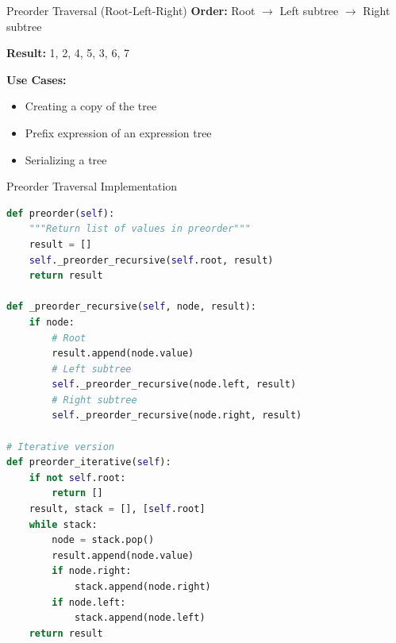 \documentclass[aspectratio=169]{beamer}
\begin{document}
\begin{frame}{Preorder Traversal (Root-Left-Right)}
  \textbf{Order:} Root $\rightarrow$ Left subtree $\rightarrow$ Right subtree

  \vspace{0.3cm}
  \begin{center}
  \end{center}

  \textbf{Result:} 1, 2, 4, 5, 3, 6, 7

  \vspace{0.3cm}
  \textbf{Use Cases:}
  \begin{itemize}
    \item Creating a copy of the tree
    \item Prefix expression of an expression tree
    \item Serializing a tree
  \end{itemize}
\end{frame}

\begin{frame}[fragile]{Preorder Traversal Implementation}
  \begin{lstlisting}[language=Python, basicstyle=\ttfamily\small]
def preorder(self):
    """Return list of values in preorder"""
    result = []
    self._preorder_recursive(self.root, result)
    return result

def _preorder_recursive(self, node, result):
    if node:
        # Root
        result.append(node.value)
        # Left subtree
        self._preorder_recursive(node.left, result)
        # Right subtree
        self._preorder_recursive(node.right, result)

# Iterative version
def preorder_iterative(self):
    if not self.root:
        return []
    result, stack = [], [self.root]
    while stack:
        node = stack.pop()
        result.append(node.value)
        if node.right:
            stack.append(node.right)
        if node.left:
            stack.append(node.left)
    return result
  \end{lstlisting}
\end{frame}
\end{document}
